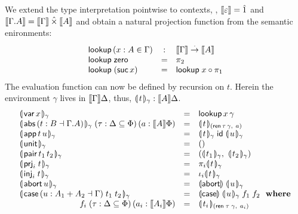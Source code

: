 \documentclass[a4paper,USenglish,cleveref, autoref]{lipics-v2019}
\begin{document}
We extend the type interpretation pointwise to contexts, \ie,
$\mathopen{{[\kern-0.14em[}} \varepsilon \mathclose{{]\kern-0.14em]}} = \hat{1}$ and
$\mathopen{{[\kern-0.14em[}} \Gamma.A \mathclose{{]\kern-0.14em]}} = \mathopen{{[\kern-0.14em[}} \Gamma \mathclose{{]\kern-0.14em]}} \mathbin{\hat\times} \mathopen{{[\kern-0.14em[}} A \mathclose{{]\kern-0.14em]}}$
and obtain a natural projection function from the semantic enironments:
\[
\begin{array}{lcl}
  \mathsf{lookup}\,(x : A \in \Gamma) & : &  \mathopen{{[\kern-0.14em[}} \Gamma \mathclose{{]\kern-0.14em]}} \stackrel{\cdot}{\to} \mathopen{{[\kern-0.14em[}} A \mathclose{{]\kern-0.14em]}} \\
  \mathsf{lookup}\;\mathsf{zero}     & = & \pi_2 \\
  \mathsf{lookup}\;(\mathsf{suc}\,x) & = & \mathsf{lookup}\;x \circ \pi_1 \\
\end{array}
\]
The evaluation function
can now be defined by recursion on $t$.
Herein the environment $\gamma$ lives in $\mathopen{{[\kern-0.14em[}} \Gamma \mathclose{{]\kern-0.14em]}} \Delta$, thus, $\llparenthesis\kern0.3ext\kern0.3ex\rrparenthesis_{\gamma} : \mathopen{{[\kern-0.14em[}} A \mathclose{{]\kern-0.14em]}} \Delta$.
\[
\begin{array}{lcl}
  \dent{\tvar\,x}\gamma & = & \tlookup\,x\,\gamma \\
  \dent{\tabs\,(t : B \from \cext \Gamma A)}\gamma \;
     (\tau : \Delta \sublist \Phi)\, (a : \den A \Phi) & = &
        \dent t {(\tren\,\tau\,\gamma,\ a)} \\
  \dent{\tapp\,t\,u} \gamma & = &
     \dent t \gamma\;\tid\;\dent u \gamma \\
  \dent{\tunit}\gamma & = & \ttempty \\
  \dent{\tpair\,t_1\,t_2}\gamma & = &
    (\dent{t_1}\gamma,\ \dent{t_2}\gamma) \\
  \dent{\prj i t}\gamma & = & \pi_i \dent t \gamma \\
  \dent{\inj i t}\gamma & = & \iota_i \dent t \gamma \\
  \dent{\tabort\,u}\gamma & = & \denabort\;\dent u \gamma \\
  \dent{\tcase\,(u : A_1 + A_2 \from \Gamma)\;t_1\;t_2}\gamma & = &
     \dencase\;\dent u \gamma\;f_1\;f_2
    \ \mbox{ \textbf{where}} \\
    \multicolumn 1 r {f_i\; (\tau : \Delta \sublist \Phi)\,(a_i : \den {A_i} \Phi)}
        & = &
        \dent {t_i} {(\tren\;\tau\;\gamma,\ {a_i})}
    \\
\end{array}
\]
\end{document}
